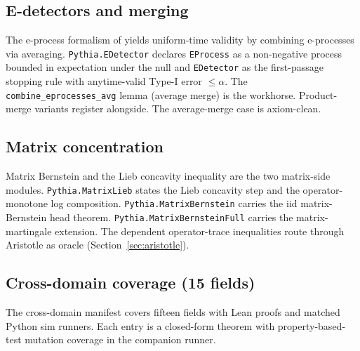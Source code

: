\subsection{E-detectors and merging}
\label{sec:library-edet}

The e-process formalism of
\citet{ramdasgrunwaldvovkshafer2023, shinramdasrinaldo2024}
yields uniform-time validity by combining e-processes via averaging.
\texttt{Pythia.EDetector} declares \texttt{EProcess} as a non-negative
process bounded in expectation under the null and \texttt{EDetector}
as the first-passage stopping rule with anytime-valid Type-I error
$\leq \alpha$. The \texttt{combine\_eprocesses\_avg} lemma (average
merge) is the workhorse. Product-merge variants register alongside.
The average-merge case is axiom-clean.

\subsection{Matrix concentration}
\label{sec:library-matrix}

Matrix Bernstein \citep{tropp2012usermatrix} and the Lieb concavity
inequality \citep{lieb1973} are the two matrix-side modules.
\texttt{Pythia.MatrixLieb} states the Lieb concavity step and the
operator-monotone log composition.
\texttt{Pythia.MatrixBernstein} carries the iid matrix-Bernstein head
theorem. \texttt{Pythia.MatrixBernsteinFull} carries the
matrix-martingale extension. The dependent operator-trace inequalities
route through Aristotle as oracle (Section~\ref{sec:aristotle}).

\subsection{Cross-domain coverage (15 fields)}
\label{sec:library-other}

The cross-domain manifest covers fifteen fields with Lean proofs
and matched Python sim runners. Each entry is a closed-form
theorem with property-based-test mutation coverage in the
companion runner.

